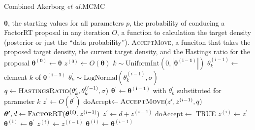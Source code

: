 \documentclass{llncs}
\newcommand{\etal}[0]{{\em et al.}\xspace}
\begin{document}
\begin{algorithm} \caption{Combined Akerborg \etal \textsc{MCMC}}\label{AMCMC}
\begin{algorithmic}
    \REQUIRE $\boldsymbol{\theta}$, the starting values for all parameters
    \REQUIRE $p$, the probability of conducing a FactorRT proposal in any iteration
    \REQUIRE $O$, a function to calculation the target density (posterior or just the ``data probability'').
    \REQUIRE \textsc{AcceptMove}, a funciton that takes the proposed target density, the current target density, and the Hastings ratio for the proposal
\STATE  $\boldsymbol{\theta^{(0)}} \leftarrow \boldsymbol{\theta}$
\STATE  $z^{(0)} \leftarrow O(\boldsymbol{\theta})$
\FOR{$i \in \left[1, 2,\ldots \infty \right) $}
        \STATE $k \sim \mbox{UniformInt}(0, \left|\boldsymbol{\theta^{(i-1)}}\right|)$
        \STATE $\theta_k^{(i-1)}\leftarrow$ element $k$ of $\boldsymbol{\theta^{(i-1)}}$
        \STATE $\theta_k^{\prime} \sim \mbox{LogNormal}(\theta_k^{(i-1)}, \sigma)$
        \STATE $q \leftarrow  \mbox{\textsc{HastingsRatio}}(\theta_k^{\prime}, \theta_k^{(i-1)}, \sigma)$
        \STATE $\boldsymbol{\theta^{\prime}}\leftarrow \boldsymbol{\theta^{(i-1)}}$ with $\theta_k^{\prime}$ substituted for parameter $k$
        \STATE $z^{\prime} \leftarrow  O(\theta^{\prime})$
        \STATE doAccept$ \leftarrow \mbox{\textsc{AcceptMove}}(z^{\prime}, z^{(i-1)}, q)$
    \ELSE
        \STATE $\boldsymbol{\theta^{\prime}}, d \leftarrow \mbox{\textsc{FactorRT}}(\boldsymbol{\theta^{(i)}}, z^{(i-1)})$
        \STATE $z^{\prime} \leftarrow  d + z^{(i-1)}$
        \STATE doAccept$ \leftarrow$ TRUE
    \ENDIF
        \STATE $z^{(i)} \leftarrow  z^{\prime}$
        \STATE $\boldsymbol{\theta^{(i)}} \leftarrow \boldsymbol{\theta}^{\prime}$
    \ELSE
    \STATE $z^{(i)} \leftarrow  z^{(i-1)}$
    \STATE $\boldsymbol{\theta^{(i)}} \leftarrow \boldsymbol{\theta}^{(i-1)}$
    \ENDIF
\ENDFOR
\end{algorithmic}
\end{algorithm}
\end{document}

